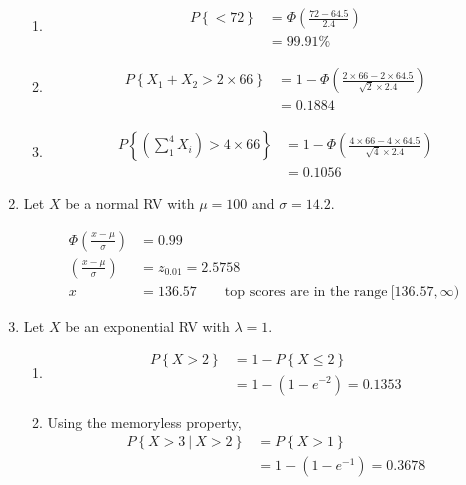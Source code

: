\begin{enumerate}
\begin{enumerate}
			\item \begin{align}
				P \left\{ < 72\right\} &= \Phi \left(\frac{72 - 64.5}{2.4}\right) \nonumber \\
				&= 99.91\%
			\end{align}
			
			\item \begin{align}
				P \left\{X_1 + X_2 > 2 \times 66\right\} &= 1 - \Phi \left(\frac{2 \times 66 - 2 \times 64.5}{\sqrt{2} \times 2.4}\right) \nonumber \\
				&= 0.1884
			\end{align}
			
			\item \begin{align}
				P \left\{\left(\sum_{1}^{4} X_i\right) > 4 \times 66\right\} &= 1 - \Phi \left(\frac{4 \times 66 - 4 \times 64.5}{\sqrt{4} \times 2.4}\right) \nonumber \\
				&= 0.1056
			\end{align}
		\end{enumerate}
	
	
	\item Let $ X $ be a normal RV with $ \mu = 100 $ and $ \sigma = 14.2 $.
			
		\begin{align}
			\Phi\left(\frac{x - \mu}{\sigma}\right) &= 0.99 \nonumber \\
			\left(\frac{x - \mu}{\sigma}\right) &= z_{0.01} = 2.5758 \nonumber \\
			x &= 136.57 \qquad \text{top scores are in the range} \ [136.57, \infty)
		\end{align}
	
	
	\item Let $ X $ be an exponential RV with $ \lambda = 1 $.
			
		\begin{enumerate}
			\item \begin{align}
				P \left\{X > 2\right\} &= 1 - P \left\{X \leq 2\right\} \nonumber \\
				&= 1 - (1 - e^{-2}) = 0.1353
			\end{align}
			
			\item Using the memoryless property,
			\begin{align}
				P \left\{X > 3\ |\ X > 2\right\} &= P \left\{X > 1 \right\} \nonumber \\
				&= 1 - (1 - e^{-1}) = 0.3678
			\end{align}
			

\end{enumerate}
\end{enumerate}
